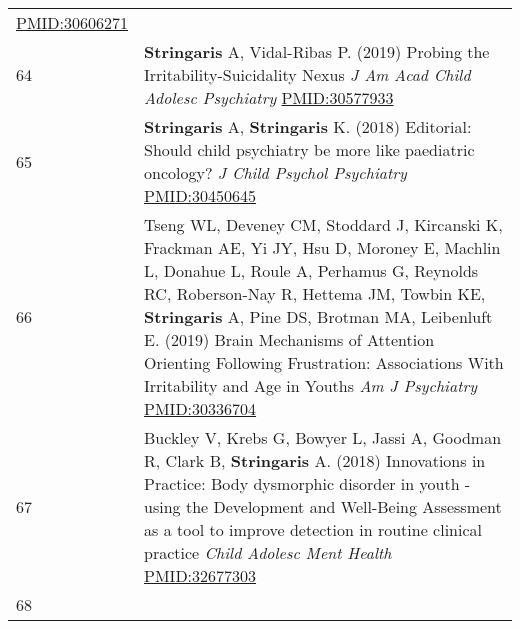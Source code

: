 \documentclass[
]{article}
\begin{document}
\begin{longtable}[]{@{}ll@{}}
\begin{minipage}[t]{0.94\columnwidth}
\url{PMID:30606271}\strut
\end{minipage}\tabularnewline
\begin{minipage}[t]{0.01\columnwidth}\raggedright
64\strut
\end{minipage} & \begin{minipage}[t]{0.94\columnwidth}\raggedright
\textbf{Stringaris} A, Vidal-Ribas P. (2019) Probing the
Irritability-Suicidality Nexus \emph{J Am Acad Child Adolesc Psychiatry}
\url{PMID:30577933}\strut
\end{minipage}\tabularnewline
\begin{minipage}[t]{0.01\columnwidth}\raggedright
65\strut
\end{minipage} & \begin{minipage}[t]{0.94\columnwidth}\raggedright
\textbf{Stringaris} A, \textbf{Stringaris} K. (2018) Editorial: Should
child psychiatry be more like paediatric oncology? \emph{J Child Psychol
Psychiatry} \url{PMID:30450645}\strut
\end{minipage}\tabularnewline
\begin{minipage}[t]{0.01\columnwidth}\raggedright
66\strut
\end{minipage} & \begin{minipage}[t]{0.94\columnwidth}\raggedright
Tseng WL, Deveney CM, Stoddard J, Kircanski K, Frackman AE, Yi JY, Hsu
D, Moroney E, Machlin L, Donahue L, Roule A, Perhamus G, Reynolds RC,
Roberson-Nay R, Hettema JM, Towbin KE, \textbf{Stringaris} A, Pine DS,
Brotman MA, Leibenluft E. (2019) Brain Mechanisms of Attention Orienting
Following Frustration: Associations With Irritability and Age in Youths
\emph{Am J Psychiatry} \url{PMID:30336704}\strut
\end{minipage}\tabularnewline
\begin{minipage}[t]{0.01\columnwidth}\raggedright
67\strut
\end{minipage} & \begin{minipage}[t]{0.94\columnwidth}\raggedright
Buckley V, Krebs G, Bowyer L, Jassi A, Goodman R, Clark B,
\textbf{Stringaris} A. (2018) Innovations in Practice: Body dysmorphic
disorder in youth - using the Development and Well-Being Assessment as a
tool to improve detection in routine clinical practice \emph{Child
Adolesc Ment Health} \url{PMID:32677303}\strut
\end{minipage}\tabularnewline
\begin{minipage}[t]{0.01\columnwidth}\raggedright
68\strut
\end{minipage} & \begin{minipage}[t]{0.94\columnwidth}\raggedright

\end{minipage}
\end{longtable}
\end{document}
